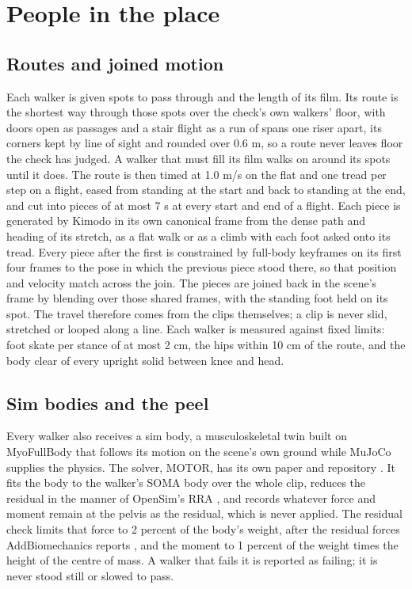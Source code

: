 \section{People in the place}\label{people-in-the-place}

\subsection{Routes and joined motion}\label{routes-and-joined-motion}

Each walker is given spots to pass through and the length of its film. Its route is the shortest way through those spots over the check's own walkers' floor, with doors open as passages and a stair flight as a run of spans one riser apart, its corners kept by line of sight and rounded over 0.6 m, so a route never leaves floor the check has judged. A walker that must fill its film walks on around its spots until it does. The route is then timed at 1.0 m/s on the flat and one tread per step on a flight, eased from standing at the start and back to standing at the end, and cut into pieces of at most 7 s at every start and end of a flight. Each piece is generated by Kimodo \citep{rempe2026kimodo} in its own canonical frame from the dense path and heading of its stretch, as a flat walk or as a climb with each foot asked onto its tread. Every piece after the first is constrained by full-body keyframes on its first four frames to the pose in which the previous piece stood there, so that position and velocity match across the join. The pieces are joined back in the scene's frame by blending over those shared frames, with the standing foot held on its spot. The travel therefore comes from the clips themselves; a clip is never slid, stretched or looped along a line. Each walker is measured against fixed limits: foot skate per stance of at most 2 cm, the hips within 10 cm of the route, and the body clear of every upright solid between knee and head.

\subsection{Sim bodies and the peel}\label{sim-bodies-and-the-peel}

Every walker also receives a sim body, a musculoskeletal twin built on MyoFullBody \citep{caggiano2022myosuite} that follows its motion on the scene's own ground while MuJoCo supplies the physics. The solver, MOTOR, has its own paper and repository \citep{motor}. It fits the body to the walker's SOMA body \citep{saito2026soma} over the whole clip, reduces the residual in the manner of OpenSim's RRA \citep{delp2007opensim}, and records whatever force and moment remain at the pelvis as the residual, which is never applied. The residual check limits that force to 2 percent of the body's weight, after the residual forces AddBiomechanics reports \citep{werling2023addbiomechanics}, and the moment to 1 percent of the weight times the height of the centre of mass. A walker that fails it is reported as failing; it is never stood still or slowed to pass.

